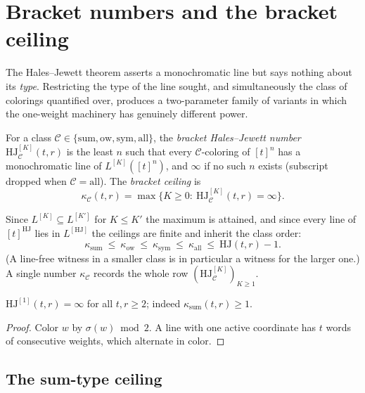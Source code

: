 \documentclass[12pt]{article}
\newcommand{\HJ}{\mathrm{HJ}}
\newcommand{\Ls}{L}
\newcommand{\ksum}{\kappa_{\mathrm{sum}}}
\newcommand{\kow}{\kappa_{\mathrm{ow}}}
\newcommand{\ksym}{\kappa_{\mathrm{sym}}}
\newcommand{\kall}{\kappa_{\mathrm{all}}}
\begin{document}
\section{Bracket numbers and the bracket ceiling}\label{sec:bracket}

The Hales--Jewett theorem asserts a monochromatic line but says nothing
about its \emph{type}. Restricting the type of the line sought, and
simultaneously the class of colorings quantified over, produces a
two-parameter family of variants in which the one-weight machinery has
genuinely different power.

\begin{definition}\label{def:bracket}
For a class $\mathcal{C}\in\{\mathrm{sum},\mathrm{ow},\mathrm{sym},
\mathrm{all}\}$, the \emph{bracket Hales--Jewett number}
$\HJ^{[K]}_{\mathcal{C}}(t,r)$ is the least $n$ such that every
$\mathcal{C}$-coloring of $[t]^{n}$ has a monochromatic line of
$\Ls^{[K]}([t]^{n})$, and $\infty$ if no such $n$ exists (subscript
dropped when $\mathcal{C}=\mathrm{all}$). The \emph{bracket ceiling} is
\[
\kappa_{\mathcal{C}}(t,r)
=\max\{K\ge 0:\ \HJ^{[K]}_{\mathcal{C}}(t,r)=\infty\}.
\]
\end{definition}

Since $\Ls^{[K]}\subseteq\Ls^{[K']}$ for $K\le K'$ the maximum is
attained, and since every line of $[t]^{\HJ}$ lies in $\Ls^{[\HJ]}$ the
ceilings are finite and inherit the class order:
\begin{equation}\label{eq:ceiling-chain}
\ksum\ \le\ \kow\ \le\ \ksym\ \le\ \kall\ \le\ \HJ(t,r)-1 .
\end{equation}
(A line-free witness in a smaller class is in particular a witness for
the larger one.) A single number $\kappa_{\mathcal{C}}$ records the
whole row $(\HJ^{[K]}_{\mathcal{C}})_{K\ge 1}$.

\begin{proposition}\label{prop:hj1}
$\HJ^{[1]}(t,r)=\infty$ for all $t,r\ge 2$; indeed
$\ksum(t,r)\ge 1$.
\end{proposition}

\begin{proof}
Color $w$ by $\sigma(w)\bmod 2$. A line with one active coordinate has
$t$ words of consecutive weights, which alternate in color.
\end{proof}

\subsection{The sum-type ceiling}\label{sec:sum-ceiling}
\end{document}
